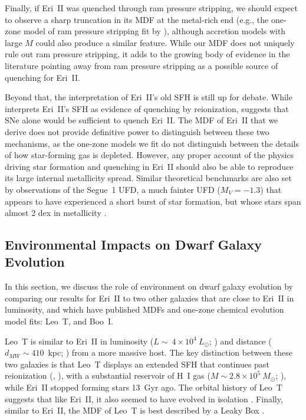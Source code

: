 \documentclass[twocolumn]{aastex63}
\begin{document}
\par Finally, if Eri~II was quenched through ram pressure stripping, we should expect to observe a sharp truncation in its MDF at the metal-rich end (e.g., the one-zone model of ram pressure stripping fit by \citealt{kirby2013LZR}), although accretion models with large $M$ could also produce a similar feature. While our MDF does not uniquely rule out ram pressure stripping, it adds to the growing body of evidence in the literature pointing away from ram pressure stripping as a possible source of quenching for Eri~II. 

\par Beyond that, the interpretation of Eri~II's old SFH is still up for debate. While \citet{simon2021EriII} interprets Eri~II's SFH as evidence of quenching by reionization, \citet{gallart2021eriii} suggests that SNe alone would be sufficient to quench Eri~II. The MDF of Eri~II that we derive does not provide definitive power to distinguish between these two mechanisms, as the one-zone models we fit do not distinguish between the details of how star-forming gas is depleted. However, any proper account of the physics driving star formation and quenching in Eri~II should also be able to reproduce its large internal metallicity spread. Similar theoretical benchmarks are also set by observations of the Segue~1 UFD, a much fainter UFD ($M_V=-1.3$) that appears to have experienced a short burst of star formation, but whose stars span almost 2 dex in metallicity \citep{frebel2014segue1}. 

\subsection{Environmental Impacts on Dwarf Galaxy Evolution}

\par In this section, we discuss the role of environment on dwarf galaxy evolution by comparing our results for Eri~II to two other galaxies that are close to Eri~II in luminosity, and which have published MDFs and one-zone chemical evolution model fits: Leo~T, and Boo~I. 

\par  Leo~T is similar to Eri~II in luminosity ($L\sim~4\times10^4~L_{\odot}$; \citealt{irwin2007}) and distance ($d_{MW}\sim410$~kpc; \citealt{clementini2012}) from a more massive host. The key distinction between these two galaxies is that Leo~T displays an extended SFH that continues past reionization (\citealt{clementini2012}, \citealt{weisz2012}), with a substantial reservoir of H~I gas ($M\sim2.8\times10^5~ M_{\odot}$; \citealt{ryan-weber2008}), while Eri~II stopped forming stars 13~Gyr ago. The orbital history of Leo~T suggests that like Eri~II, it also seemed to have evolved in isolation \citep{battaglia2021}. Finally, similar to Eri~II, the MDF of Leo~T is best described by a Leaky Box \citep{kirby2013LZR}. 
\end{document}
